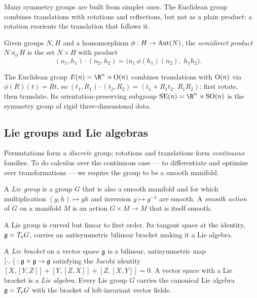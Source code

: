 Many symmetry groups are built from simpler ones. The Euclidean group combines
translations with rotations and reflections, but not as a plain product: a
rotation reorients the translation that follows it.

\begin{definition}
\label{def:found:semidirect}
Given groups $N, H$ and a homomorphism $\phi : H \to \operatorname{Aut}(N)$, the
\emph{semidirect product} $N \rtimes_\phi H$ is the set $N \times H$ with product
\[
  (n_1, h_1)\cdot(n_2, h_2) = \bigl(n_1\,\phi(h_1)(n_2),\; h_1 h_2\bigr).
\]
\end{definition}

\begin{example}
\label{ex:found:euclidean}
The Euclidean group $E(n) = \R^n \rtimes \Orth(n)$ combines translations with
$\operatorname{O}(n)$ via $\phi(R)(t) = Rt$, so
$(t_1, R_1)\cdot(t_2, R_2) = (t_1 + R_1 t_2,\, R_1 R_2)$: first rotate, then
translate. Its orientation-preserving subgroup $\SE(n) = \R^n \rtimes \SO(n)$ is
the symmetry group of rigid three-dimensional data.
\end{example}

\subsection{Lie groups and Lie algebras}
\label{sec:found:lie-groups}

Permutations form a \emph{discrete} group; rotations and translations form
\emph{continuous} families. To do calculus over the continuous case --- to
differentiate and optimize over transformations --- we require the group to be a
smooth manifold.

\begin{definition}
\label{def:found:liegroup}
A \emph{Lie group} is a group $G$ that is also a smooth manifold and for which
multiplication $(g,h) \mapsto gh$ and inversion $g \mapsto g^{-1}$ are smooth. A
\emph{smooth action} of $G$ on a manifold $M$ is an action $G \times M \to M$
that is itself smooth.
\end{definition}

A Lie group is curved but linear to first order. Its tangent space at the
identity, $\mathfrak{g} = T_e G$, carries an antisymmetric bilinear bracket making it
a Lie algebra.

\begin{definition}
\label{def:found:liealgebra}
A \emph{Lie bracket} on a vector space $\mathfrak{g}$ is a bilinear, antisymmetric map
$[\cdot,\cdot] : \mathfrak{g} \times \mathfrak{g} \to \mathfrak{g}$ satisfying the Jacobi
identity $[X,[Y,Z]] + [Y,[Z,X]] + [Z,[X,Y]] = 0$. A vector space with a Lie
bracket is a \emph{Lie algebra}. Every Lie group $G$ carries the canonical Lie
algebra $\mathfrak{g} = T_e G$ with the bracket of left-invariant vector fields.
\end{definition}

